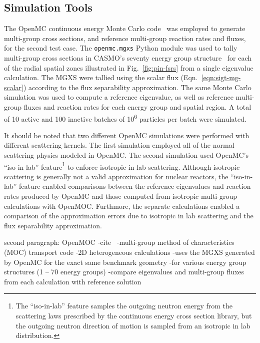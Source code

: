 \subsection{Simulation Tools}
\label{subsubsec:sim-tools-case2}

The OpenMC continuous energy Monte Carlo code~\citep{romano2013openmc} was employed to generate multi-group cross sections, and reference multi-group reaction rates and fluxes, for the second test case. The \texttt{openmc.mgxs} Python module was used to tally multi-group cross sections in CASMO's seventy energy group structure~\citep{rhodes2006casmo} for each of the radial spatial zones illustrated in Fig.~\ref{fig:pin-fsrs} from a single eigenvalue calculation. The MGXS were tallied using the scalar flux (Eqn.~\ref{eqn:sigt-mg-scalar}) according to the flux separability approximation. The same Monte Carlo simulation was used to compute a reference eigenvalue, as well as reference multi-group fluxes and reaction rates for each energy group and spatial region. A total of 10 active and 100 inactive batches of 10\textsuperscript{6} particles per batch were simulated. 

It should be noted that two different OpenMC simulations were performed with different scattering kernels. The first simulation employed all of the normal scattering physics modeled in OpenMC. The second simulation used OpenMC's ``iso-in-lab'' feature\footnote{The ``iso-in-lab'' feature samples the outgoing neutron energy from the scattering laws prescribed by the continuous energy cross section library, but the outgoing neutron direction of motion is sampled from an isotropic in lab distribution.} to enforce isotropic in lab scattering. Although isotropic scattering is generally not a valid approximation for nuclear reactors, the ``iso-in-lab'' feature enabled comparisons between the reference eigenvalues and reaction rates produced by OpenMC and those computed from isotropic multi-group calculations with OpenMOC. Furthmore, the separate calculations enabled a comparison of the approximation errors due to isotropic in lab scattering and the flux separability approximation.


second paragraph: OpenMOC
-cite~\cite{boyd2014openmoc}
-multi-group method of characteristics (MOC) transport code
-2D heterogeneous calculations
-uses the MGXS generated by OpenMC for the exact same benchmark geometry
  -for various energy group structures (1 -- 70 energy groups)
-compare eigenvalues and multi-group fluxes from each calculation with reference solution